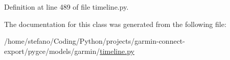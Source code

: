 Definition at line 489 of file timeline.\+py.



The documentation for this class was generated from the following file\+:\begin{DoxyCompactItemize}
\item 
/home/stefano/\+Coding/\+Python/projects/garmin-\/connect-\/export/pygce/models/garmin/\hyperlink{timeline_8py}{timeline.\+py}\end{DoxyCompactItemize}
